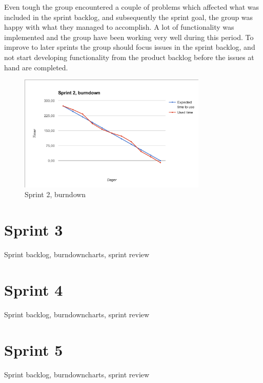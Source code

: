 Even tough the group encountered a couple of problems which affected what was included in the sprint backlog, and subsequently the sprint goal, the group was happy with what they managed to accomplish. A lot of functionality was implemented and the group have been working very well during this period. To improve to later sprints the group should focus issues in the sprint backlog, and not start developing functionality from the product backlog before the issues at hand are completed. 

\begin{figure}[h!]
\centering
    \includegraphics[width=0.8\textwidth]{fig/sprint2}
\caption{Sprint 2, burndown}
\end{figure}

\section{Sprint 3}
Sprint backlog, burndowncharts, sprint review

\section{Sprint 4}
Sprint backlog, burndowncharts, sprint review

\section{Sprint 5}
Sprint backlog, burndowncharts, sprint review

\cleardoublepage